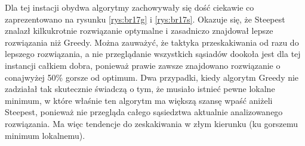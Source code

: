 Dla tej instacji obydwa algorytmy zachowywały się dość ciekawie co zaprezentowano na rysunku \ref{rys:br17g} i \ref{rys:br17s}. Okazuje się, że Steepest znalazł kilkukrotnie rozwiązanie optymalne i zasadniczo znajdował lepsze rozwiązania niż Greedy. Można zauważyć, że taktyka przeskakiwania od razu do lepszego rozwiązania, a nie przeglądanie wszystkich sąsiadów dookoła jest dla tej instancji całkiem dobra, ponieważ prawie zawsze znajdowano rozwiązanie o conajwyżej 50\% gorsze od optimum. Dwa przypadki, kiedy algorytm Greedy nie zadziałał tak skutecznie świadczą o tym, że musiało istnieć pewne lokalne minimum, w które właśnie ten algorytm ma większą szansę wpaść aniżeli Steepest, ponieważ nie przegląda całego sąsiedztwa aktualnie analizowanego rozwiązania. Ma więc tendencje do zeskakiwania w złym kierunku (ku gorszemu minimum lokalnemu).


